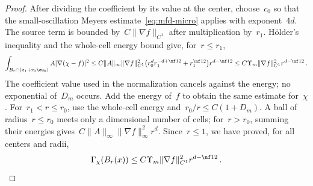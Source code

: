 \documentclass[11pt]{amsart}
\begin{document}
\begin{proof}
\smallskip

After dividing the coefficient by its value at the center, choose~$c_0$ so that the small-oscillation Meyers estimate~\eqref{eq:mfd-micro} applies with exponent~$4d$. The source term is bounded by~$C\|\nabla f\|_{C^1}$ after multiplication by~$r_1$. H\"older's inequality and the whole-cell energy bound give, for~$r\leq r_1$,
\begin{equation*}
	\int_{B_r\cap(x_1+r_0\cu_0)}A|\nabla(\chi-f)|^2
	\leq C\|A\|_\infty\|\nabla f\|_{C^1}^2
	\bigl(r_0^dr_1^{-d+\nf12}+r_1^{\nf12}\bigr)r^{d-\nf12}
	\leq C\Upsilon_m\|\nabla f\|_{C^1}^2r^{d-\nf12}\,.
\end{equation*}
The coefficient value used in the normalization cancels against the energy; no exponential of~$D_m$ occurs. Add the energy of~$f$ to obtain the same estimate for~$\chi$. For~$r_1<r\leq r_0$, use the whole-cell energy and~$r_0/r\leq C(1+D_m)$. A ball of radius~$r\leq r_0$ meets only a dimensional number of cells; for~$r>r_0$, summing their energies gives~$C\|A\|_\infty\|\nabla f\|_\infty^2r^d$. Since~$r\leq1$, we have proved, for all centers and radii,
\begin{equation}
	\Gamma_\chi(B_r(x))
	\leq C\Upsilon_m\|\nabla f\|_{C^1}^2r^{d-\nf12}\,.
	\label{eq:mfd-static-microscopic}
\end{equation}

\smallskip


\end{proof}
\end{document}
